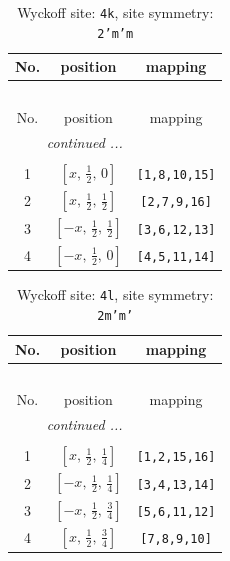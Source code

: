 \documentclass[fleqn,8pt]{jsarticle}
\begin{document}
\renewcommand{\arraystretch}{1.2}
\begin{longtable}{ccc}
\caption{Wyckoff site: {\tt 4k}, site symmetry: {\tt 2'm'm}}
 \\
 \hline \hline
No. & position & mapping \\ \hline \endfirsthead

\multicolumn{2}{l}{\tablename\ \thetable{}} \\
 \hline \hline
No. & position & mapping \\ \hline \endhead

 \hline \hline
\multicolumn{2}{r}{\footnotesize\it continued ...} \\ \endfoot

 \hline \hline
\multicolumn{2}{r}{} \\ \endlastfoot

1 & $\left[ x,\, \frac{1}{2},\, 0 \right]$ & {\tt [1,8,10,15]} \\ \hline
2 & $\left[ x,\, \frac{1}{2},\, \frac{1}{2} \right]$ & {\tt [2,7,9,16]} \\ \hline
3 & $\left[ - x,\, \frac{1}{2},\, \frac{1}{2} \right]$ & {\tt [3,6,12,13]} \\ \hline
4 & $\left[ - x,\, \frac{1}{2},\, 0 \right]$ & {\tt [4,5,11,14]} \\
\end{longtable}
\renewcommand{\arraystretch}{1.2}
\begin{longtable}{ccc}
\caption{Wyckoff site: {\tt 4l}, site symmetry: {\tt 2m'm'}}
 \\
 \hline \hline
No. & position & mapping \\ \hline \endfirsthead

\multicolumn{2}{l}{\tablename\ \thetable{}} \\
 \hline \hline
No. & position & mapping \\ \hline \endhead

 \hline \hline
\multicolumn{2}{r}{\footnotesize\it continued ...} \\ \endfoot

 \hline \hline
\multicolumn{2}{r}{} \\ \endlastfoot

1 & $\left[ x,\, \frac{1}{2},\, \frac{1}{4} \right]$ & {\tt [1,2,15,16]} \\ \hline
2 & $\left[ - x,\, \frac{1}{2},\, \frac{1}{4} \right]$ & {\tt [3,4,13,14]} \\ \hline
3 & $\left[ - x,\, \frac{1}{2},\, \frac{3}{4} \right]$ & {\tt [5,6,11,12]} \\ \hline
4 & $\left[ x,\, \frac{1}{2},\, \frac{3}{4} \right]$ & {\tt [7,8,9,10]} \\
\end{longtable}
\end{document}

